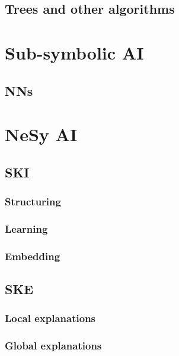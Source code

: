 \documentclass[12pt,a4paper,openright,twoside]{book}
\begin{document}
\subsection{Trees and other algorithms}\label{subsec:trees-and-other-algorithms}

\section{Sub-symbolic \ac{AI}}\label{sec:sub-symbolic-ai}

\subsection{\Aclp{NN}}\label{subsec:neural-networks}

\section{\Acl{NeSy} \ac{AI}}\label{sec:nesy-ai}

\subsection{\Acl{SKI}}\label{subsec:ski}

\subsubsection{Structuring}\label{subsubsec:structuring}

\subsubsection{Learning}\label{subsubsec:learning}

\subsubsection{Embedding}\label{subsec:embedding}

\subsection{\Acl{SKE}}\label{subsec:ske}

\subsubsection{Local explanations}\label{subsubsec:local-explanations}

\subsubsection{Global explanations}\label{subsubsec:global-explanations}
\end{document}
